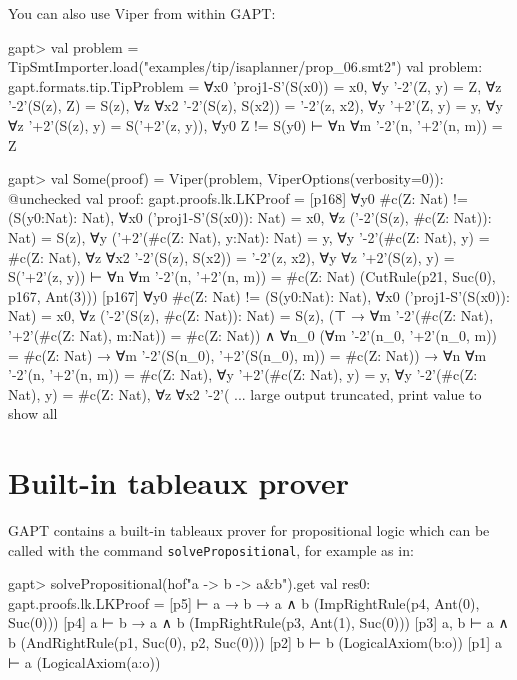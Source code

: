 \documentclass[a4paper,11pt]{book}
\begin{document}
You can also use Viper from within GAPT:
\begin{clilisting}
  gapt> val problem = TipSmtImporter.load("examples/tip/isaplanner/prop_06.smt2")
  val problem: gapt.formats.tip.TipProblem = ∀x0 'proj1-S'(S(x0)) = x0,
  ∀y '-2'(Z, y) = Z,
  ∀z '-2'(S(z), Z) = S(z),
  ∀z ∀x2 '-2'(S(z), S(x2)) = '-2'(z, x2),
  ∀y '+2'(Z, y) = y,
  ∀y ∀z '+2'(S(z), y) = S('+2'(z, y)),
  ∀y0 Z != S(y0)
  ⊢
  ∀n ∀m '-2'(n, '+2'(n, m)) = Z

  gapt> val Some(proof) = Viper(problem, ViperOptions(verbosity=0)): @unchecked
  val proof: gapt.proofs.lk.LKProof = [p168] ∀y0 #c(Z: Nat) != (S(y0:Nat): Nat),
  ∀x0 ('proj1-S'(S(x0)): Nat) = x0,
  ∀z ('-2'(S(z), #c(Z: Nat)): Nat) = S(z),
  ∀y ('+2'(#c(Z: Nat), y:Nat): Nat) = y,
  ∀y '-2'(#c(Z: Nat), y) = #c(Z: Nat),
  ∀z ∀x2 '-2'(S(z), S(x2)) = '-2'(z, x2),
  ∀y ∀z '+2'(S(z), y) = S('+2'(z, y))
  ⊢
  ∀n ∀m '-2'(n, '+2'(n, m)) = #c(Z: Nat)    (CutRule(p21, Suc(0), p167, Ant(3)))
  [p167] ∀y0 #c(Z: Nat) != (S(y0:Nat): Nat),
  ∀x0 ('proj1-S'(S(x0)): Nat) = x0,
  ∀z ('-2'(S(z), #c(Z: Nat)): Nat) = S(z),
  (⊤ → ∀m '-2'(#c(Z: Nat), '+2'(#c(Z: Nat), m:Nat)) = #c(Z: Nat)) ∧
  ∀n_0
  (∀m '-2'(n_0, '+2'(n_0, m)) = #c(Z: Nat) →
  ∀m '-2'(S(n_0), '+2'(S(n_0), m)) = #c(Z: Nat)) →
  ∀n ∀m '-2'(n, '+2'(n, m)) = #c(Z: Nat),
  ∀y '+2'(#c(Z: Nat), y) = y,
  ∀y '-2'(#c(Z: Nat), y) = #c(Z: Nat),
  ∀z ∀x2 '-2'( ... large output truncated, print value to show all

\end{clilisting}

\section{Built-in tableaux prover}

GAPT contains a built-in tableaux prover for propositional logic
which can be called with the command \texttt{solvePropositional}, for example as in:
\begin{clilisting}
  gapt> solvePropositional(hof"a -> b -> a&b").get
  val res0: gapt.proofs.lk.LKProof = [p5]  ⊢ a → b → a ∧ b    (ImpRightRule(p4, Ant(0), Suc(0)))
  [p4] a ⊢ b → a ∧ b    (ImpRightRule(p3, Ant(1), Suc(0)))
  [p3] a, b ⊢ a ∧ b    (AndRightRule(p1, Suc(0), p2, Suc(0)))
  [p2] b ⊢ b    (LogicalAxiom(b:o))
  [p1] a ⊢ a    (LogicalAxiom(a:o))

\end{clilisting}
\end{document}
